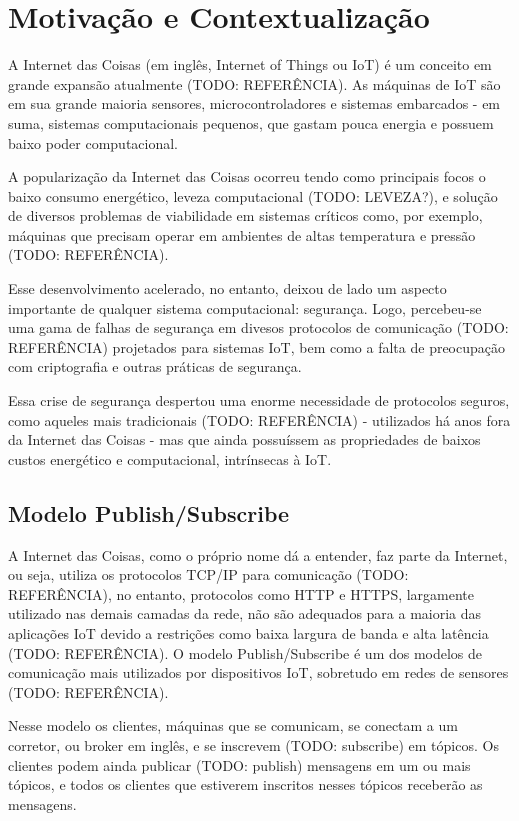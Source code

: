 \section{Motivação e Contextualização}
A Internet das Coisas (em inglês, Internet of Things ou IoT) é um conceito em grande expansão atualmente (TODO: REFERÊNCIA). As máquinas de IoT são em sua grande maioria sensores, microcontroladores e sistemas embarcados \-- em suma, sistemas computacionais pequenos, que gastam pouca energia e possuem baixo poder computacional. 

A popularização da Internet das Coisas ocorreu tendo como principais focos o baixo consumo energético, leveza computacional (TODO: LEVEZA?), e solução de diversos problemas de viabilidade em sistemas críticos como, por exemplo, máquinas que precisam operar em ambientes de altas temperatura e pressão (TODO: REFERÊNCIA).

Esse desenvolvimento acelerado, no entanto, deixou de lado um aspecto importante de qualquer sistema computacional: segurança. Logo, percebeu-se uma gama de falhas de segurança em divesos protocolos de comunicação (TODO: REFERÊNCIA) projetados para sistemas IoT, bem como a falta de preocupação com criptografia e outras práticas de segurança.

Essa crise de segurança despertou uma enorme necessidade de protocolos seguros, como aqueles mais tradicionais (TODO: REFERÊNCIA) \-- utilizados há anos fora da Internet das Coisas \-- mas que ainda possuíssem as propriedades de baixos custos energético e computacional, intrínsecas à IoT.


\subsection{Modelo Publish/Subscribe}
A Internet das Coisas, como o próprio nome dá a entender, faz parte da Internet, ou seja, utiliza os protocolos TCP/IP para comunicação (TODO: REFERÊNCIA), no entanto, protocolos como HTTP e HTTPS, largamente utilizado nas demais camadas da rede, não são adequados para a maioria das aplicações IoT devido a restrições como baixa largura de banda e alta latência (TODO: REFERÊNCIA). O modelo Publish/Subscribe é um dos modelos de comunicação mais utilizados por dispositivos IoT, sobretudo em redes de sensores (TODO: REFERÊNCIA).

Nesse modelo os clientes, máquinas que se comunicam, se conectam a um corretor, ou broker em inglês, e se inscrevem (TODO: subscribe) em tópicos. Os clientes podem ainda publicar (TODO: publish) mensagens em um ou mais tópicos, e todos os clientes que estiverem inscritos nesses tópicos receberão as mensagens.

